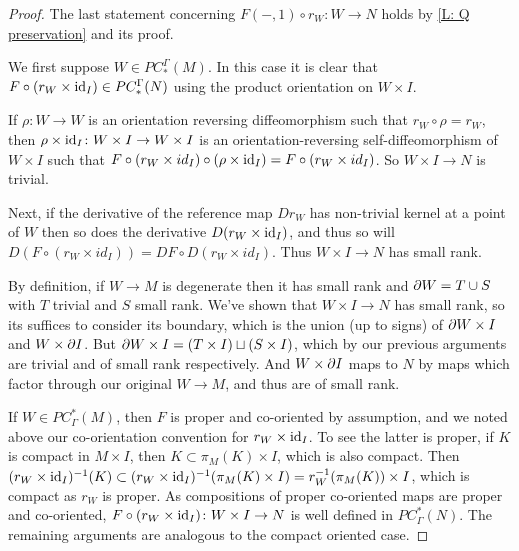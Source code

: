 \begin{proof}
	The last statement concerning $F(-,1) \circ r_W \colon W \to N$ holds by \cref{L: Q preservation} and its proof.

	We first suppose $W \in PC_*^\Gamma(M)$.
	In this case it is clear that $F \circ (r_W \times \mathrm{id}_I) \in PC_*^\Gamma(N)$ using the product orientation on $W \times I$.

	If $\rho \colon W \to W$ is an orientation reversing diffeomorphism such that $r_W \circ \rho = r_W$, then
	$\rho \times \mathrm{id}_I \colon W \times I \to W \times I$ is an orientation-reversing self-diffeomorphism of $W \times I$ such that $F \circ (r_W \times id_I) \circ (\rho \times \mathrm{id}_I) = F \circ (r_W \times id_I)$.
	So $W \times I \to N$ is trivial.

	\begin{comment}
	\end{comment}

	Next, if the derivative of the reference map $Dr_W$ has non-trivial kernel at a point of $W$ then so does
	the derivative $D(r_W \times \mathrm{id}_I)$, and thus so
	will $D(F \circ (r_W \times id_I)) = DF \circ D(r_W \times id_I)$.
	Thus $W \times I \to N$ has small rank.

	By definition, if $W \to M$ is degenerate then it has small rank and $\partial W = T \cup S$ with $T$ trivial and $S$ small rank.
	We've shown that $W \times I \to N$ has small rank, so its suffices to consider its boundary,
	which is the union (up to signs) of $\partial W \times I$ and $W \times \partial I$.
	But $\partial W \times I = (T \times I) \sqcup (S \times I)$, which by our previous
	arguments are trivial and of small rank respectively.
	And $W \times \partial I$ maps to $N$ by maps which factor through our original $W \to M$,
	and thus are of small rank.

	If $W \in PC^*_\Gamma(M)$, then $F$ is proper and co-oriented by assumption, and we noted above our co-orientation convention for $r_W \times \mathrm{id}_I$.
	To see the latter is proper, if $K$ is compact in $M \times I$, then $K \subset \pi_M(K) \times I$, which is also compact.
	Then $(r_W \times \mathrm{id}_I)^{-1}(K) \subset (r_W \times \mathrm{id}_I)^{-1}(\pi_M(K) \times I) = r_W^{-1}(\pi_M(K)) \times I$, which is compact as $r_W$ is proper.
	As compositions of proper co-oriented maps are proper and co-oriented, $F \circ (r_W \times \mathrm{id}_I) \colon W \times I \to N$ is well defined in $PC^*_\Gamma(N)$.
	The remaining arguments are analogous to the compact oriented case.
\end{proof}


